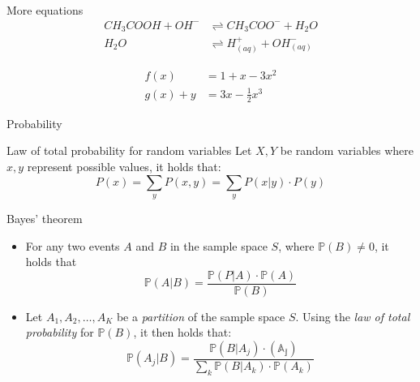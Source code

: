 \documentclass[aspectratio=169,hyperref={pdfpagelabels=false}]{beamer}
\begin{document}
\begin{frame}{More equations}
    \begin{equation}
        \begin{aligned}
            CH_3COOH + OH^{-} & \rightleftharpoons CH_3COO^{-} + H_2O           \\
            H_2O              & \rightleftharpoons H^{+}_{(aq)} + OH^{-}_{(aq)}
        \end{aligned}
    \end{equation}


    \begin{align}
        \label{eq:align1}
        f(x)     & = 1 + x - 3 x^2        \\
        \label{eq:align2}
        g(x) + y & = 3x - \frac{1}{2} x^3
    \end{align}
\end{frame}

\begin{frame}[allowframebreaks]{Probability}
    \begin{block}{Law of total probability for random variables}
        Let \(X,Y\) be random variables where \(x,y\) represent possible values, it holds that:
        \[
            P(x) = \sum_y P(x,y) = \sum_y P(x|y)\cdot P(y)
        \]
    \end{block}
    \framebreak


    \begin{block}{Bayes' theorem}
        \begin{itemize}
            \item For any two events \(A\) and \(B\) in the sample space \(S\), where \(\mathds{P}(B) \neq 0\), it holds that
                  \[\mathds{P}(A|B) = \frac{\mathds{P}(P|A) \cdot \mathds{P}(A)}{\mathds{P}(B)}\]
            \item Let \(A_1, A_2, \dots , A_K\) be a \textit{partition} of the sample space \(S\). Using the \textit{law of total probability} for \(\mathds{P}(B)\), it then holds that:
                  \[
                      \mathds{P}(A_j | B) = \frac{\mathds{P}(B|A_j) \cdot \mathds{(A_j)}}{\sum_k \mathds{P}(B|A_k) \cdot \mathds{P}(A_k)}
                  \]
        \end{itemize}
    \end{block}
\end{frame}
\end{document}
